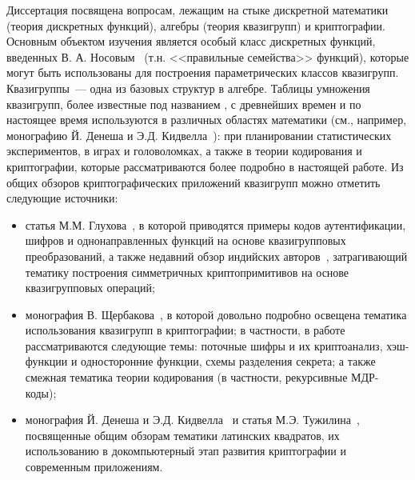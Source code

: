 {\actuality} 

    Диссертация посвящена вопросам, лежащим на стыке дискретной математики (теория дискретных функций), алгебры (теория квазигрупп) и криптографии.
    Основным объектом изучения является особый класс дискретных функций, введенных В. А. Носовым~\autocite{nosov98, nosov99} (т.н. <<правильные семейства>> функций), которые могут быть использованы для построения параметрических классов квазигрупп.
    Квазигруппы~--- одна из базовых структур в алгебре.
    Таблицы умножения квазигрупп, более известные под названием , с древнейших времен и по настоящее время используются в различных областях математики (см., например, монографию Й. Денеша и Э.Д. Кидвелла~\autocite{keedwell}): при планировании статистических экспериментов, в играх и головоломках, а также в теории кодирования и криптографии, которые рассматриваются более подробно в настоящей работе.
    Из общих обзоров криптографических приложений квазигрупп можно отметить следующие источники:
    \begin{itemize}
        \item статья М.М. Глухова~\autocite{glukhov}, в которой приводятся примеры кодов аутентификации, шифров и однонаправленных функций на основе квазигрупповых преобразований, а также недавний обзор индийских авторов~\autocite{chauhan2021quasigroups}, затрагивающий тематику построения симметричных криптопримитивов на основе квазигрупповых операций;
        \item монография В. Щербакова~\autocite{shcherbacov2017elements}, в которой довольно подробно освещена тематика использования квазигрупп в криптографии; в частности, в работе рассматриваются следующие темы: поточные шифры и их криптоанализ, хэш-функции и односторонние функции, схемы разделения секрета; а также смежная тематика теории кодирования (в частности, рекурсивные МДР-коды);
        \item монография Й. Денеша и Э.Д. Кидвелла~\autocite{keedwell} и статья М.Э. Тужилина~\autocite{tuzhilin2012}, посвященные общим обзорам тематики латинских квадратов, их использованию в докомпьютерный этап развития криптографии и современным приложениям.
    \end{itemize}

